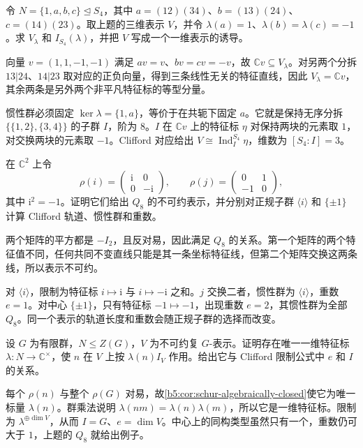 \begin{exercise}\label{b5:ex:04-s4-klein-four}
	令 \(N=\{1,a,b,c\}\trianglelefteq S_4\)，其中 \(a=(12)(34)\)、\(b=(13)(24)\)、\(c=(14)(23)\)。取上题的三维表示 \(V\)，并令 \(\lambda(a)=1\)、\(\lambda(b)=\lambda(c)=-1\)。求 \(V_\lambda\) 和 \(I_{S_4}(\lambda)\)，并把 \(V\) 写成一个一维表示的诱导。
\end{exercise}
\begin{solution}
	向量 \(v=(1,1,-1,-1)\) 满足 \(av=v\)、\(bv=cv=-v\)，故 \(\mathbb Cv\subseteq V_\lambda\)。对另两个分拆 \(13|24\)、\(14|23\) 取对应的正负向量，得到三条线性无关的特征直线，因此 \(V_\lambda=\mathbb Cv\)，其余两条是另外两个非平凡特征标的等型分量。

	惯性群必须固定 \(\ker\lambda=\{1,a\}\)，等价于在共轭下固定 \(a\)。它就是保持无序分拆 \(\bigl\{\{1,2\},\{3,4\}\bigr\}\) 的子群 \(I\)，阶为 \(8\)。\(I\) 在 \(\mathbb Cv\) 上的特征标 \(\eta\) 对保持两块的元素取 \(1\)，对交换两块的元素取 \(-1\)。Clifford 对应给出 \(V\cong\operatorname{Ind}_I^{S_4}\eta\)，维数为 \([S_4:I]=3\)。
\end{solution}

\begin{exercise}\label{b5:ex:04-quaternion-restrictions}
	在 \(\mathbb C^2\) 上令
	\[
		\rho(i)=\begin{pmatrix}\mathrm i&0\\0&-\mathrm i\end{pmatrix},
		\qquad
		\rho(j)=\begin{pmatrix}0&1\\-1&0\end{pmatrix},
	\]
	其中 \(\mathrm i^2=-1\)。证明它们给出 \(Q_8\) 的不可约表示，并分别对正规子群 \(\langle i\rangle\) 和 \(\{\pm1\}\) 计算 Clifford 轨道、惯性群和重数。
\end{exercise}
\begin{solution}
	两个矩阵的平方都是 \(-I_2\)，且反对易，因此满足 \(Q_8\) 的关系。第一个矩阵的两个特征值不同，任何共同不变直线只能是其一条坐标特征线，但第二个矩阵交换这两条线，所以表示不可约。

	对 \(\langle i\rangle\)，限制为特征标 \(i\mapsto\mathrm i\) 与 \(i\mapsto-\mathrm i\) 之和。\(j\) 交换二者，惯性群为 \(\langle i\rangle\)，重数 \(e=1\)。对中心 \(\{\pm1\}\)，只有特征标 \(-1\mapsto-1\)，出现重数 \(e=2\)，其惯性群为全部 \(Q_8\)。同一个表示的轨道长度和重数会随正规子群的选择而改变。
\end{solution}

\begin{exercise}\label{b5:ex:04-central-subgroup}
	设 \(G\) 为有限群，\(N\leq Z(G)\)，\(V\) 为不可约复 \(G\)-表示。证明存在唯一一维特征标 \(\lambda:N\to\mathbb C^\times\)，使 \(n\) 在 \(V\) 上按 \(\lambda(n)I_V\) 作用。给出它与 Clifford 限制公式中 \(e\) 和 \(I\) 的关系。
\end{exercise}
\begin{solution}
	每个 \(\rho(n)\) 与整个 \(\rho(G)\) 对易，故\cref{b5:cor:schur-algebraically-closed}使它为唯一标量 \(\lambda(n)\)。群乘法说明 \(\lambda(nm)=\lambda(n)\lambda(m)\)，所以它是一维特征标。限制为 \(\lambda^{\oplus\dim V}\)，从而 \(I=G\)、\(e=\dim V\)。中心上的同构类型虽然只有一个，重数仍可大于 \(1\)，上题的 \(Q_8\) 就给出例子。
\end{solution}


